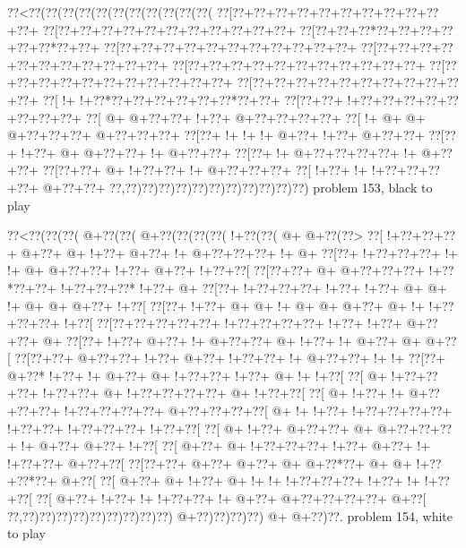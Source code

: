 \vbox{\vbox{\goo
\0??<\0??(\0??(\0??(\0??(\0??(\0??(\0??(\0??(\0??(\0??(\0??(
\0??[\0??+\0??+\0??+\0??+\0??+\0??+\0??+\0??+\0??+\0??+\0??+
\0??[\0??+\0??+\0??+\0??+\0??+\0??+\0??+\0??+\0??+\0??+\0??+
\0??[\0??+\0??+\0??*\0??+\0??+\0??+\0??+\0??+\0??*\0??+\0??+
\0??[\0??+\0??+\0??+\0??+\0??+\0??+\0??+\0??+\0??+\0??+\0??+
\0??[\0??+\0??+\0??+\0??+\0??+\0??+\0??+\0??+\0??+\0??+\0??+
\0??[\0??+\0??+\0??+\0??+\0??+\0??+\0??+\0??+\0??+\0??+\0??+
\0??[\0??+\0??+\0??+\0??+\0??+\0??+\0??+\0??+\0??+\0??+\0??+
\0??[\0??+\0??+\0??+\0??+\0??+\0??+\0??+\0??+\0??+\0??+\0??+
\0??[\- !+\- !+\0??*\0??+\0??+\0??+\0??+\0??+\0??*\0??+\0??+
\0??[\0??+\0??+\- !+\0??+\0??+\0??+\0??+\0??+\0??+\0??+\0??+
\0??[\- @+\- @+\0??+\0??+\- !+\0??+\- @+\0??+\0??+\0??+\0??+
\0??[\- !+\- @+\- @+\- @+\0??+\0??+\0??+\- @+\0??+\0??+\0??+
\0??[\0??+\- !+\- !+\- !+\- @+\0??+\- !+\0??+\- @+\0??+\0??+
\0??[\0??+\- !+\0??+\- @+\- @+\0??+\0??+\- !+\- @+\0??+\0??+
\0??[\0??+\- !+\- @+\0??+\0??+\0??+\0??+\- !+\- @+\0??+\0??+
\0??[\0??+\0??+\- @+\- !+\0??+\0??+\- !+\- @+\0??+\0??+\0??+
\0??[\- !+\0??+\- !+\- !+\0??+\0??+\0??+\0??+\- @+\0??+\0??+
\0??,\0??)\0??)\0??)\0??)\0??)\0??)\0??)\0??)\0??)\0??)\0??)
}
\hfil problem 153, black to play\hfil\break
}

\vbox{\vbox{\goo
\0??<\0??(\0??(\0??(\- @+\0??(\0??(\- @+\0??(\0??(\0??(\0??(\- !+\0??(\0??(\- @+\- @+\0??(\0??>
\0??[\- !+\0??+\0??+\0??+\- @+\0??+\- @+\- !+\0??+\- @+\0??+\- !+\- @+\0??+\0??+\0??+\- !+\- @+
\0??[\0??+\- !+\0??+\0??+\0??+\- !+\- !+\- @+\- @+\0??+\0??+\- !+\0??+\- @+\0??+\- !+\0??+\0??[
\0??[\0??+\0??+\- @+\- @+\0??+\0??+\0??+\- !+\0??*\0??+\0??+\- !+\0??+\0??+\0??*\- !+\0??+\- @+
\0??[\0??+\- !+\0??+\0??+\0??+\- !+\0??+\- !+\0??+\- @+\- @+\- !+\- @+\- @+\- @+\0??+\- !+\0??[
\0??[\0??+\- !+\0??+\- @+\- @+\- !+\- @+\- @+\- @+\0??+\- @+\- !+\- !+\0??+\0??+\0??+\- !+\0??[
\0??[\0??+\0??+\0??+\0??+\0??+\- !+\0??+\0??+\0??+\0??+\- !+\0??+\- !+\0??+\- @+\0??+\0??+\- @+
\0??[\0??+\- !+\0??+\- @+\0??+\- !+\- @+\0??+\0??+\- @+\- !+\0??+\- !+\- @+\0??+\- @+\- @+\0??[
\0??[\0??+\0??+\- @+\0??+\0??+\- !+\0??+\- @+\0??+\- !+\0??+\0??+\- !+\- @+\0??+\0??+\- !+\- !+
\0??[\0??+\- @+\0??*\- !+\0??+\- !+\- @+\0??+\- @+\- !+\0??+\0??+\- !+\0??+\- @+\- !+\- !+\0??[
\0??[\- @+\- !+\0??+\0??+\0??+\- !+\0??+\0??+\- @+\- !+\0??+\0??+\0??+\0??+\- @+\- !+\0??+\0??[
\0??[\- @+\- !+\0??+\- !+\- @+\0??+\0??+\0??+\- !+\0??+\0??+\0??+\0??+\- @+\0??+\0??+\0??+\0??[
\- @+\- !+\- !+\0??+\- !+\0??+\0??+\0??+\0??+\- !+\0??+\0??+\- !+\0??+\0??+\0??+\- !+\0??+\0??[
\0??[\- @+\- !+\0??+\- @+\0??+\0??+\- @+\- @+\0??+\0??+\0??+\- !+\- @+\0??+\- @+\0??+\- !+\0??[
\0??[\- @+\0??+\- @+\- !+\0??+\0??+\0??+\- !+\0??+\- @+\0??+\- !+\- !+\0??+\0??+\- @+\0??+\0??[
\0??[\0??+\0??+\- @+\0??+\- @+\0??+\- @+\- @+\0??*\0??+\- @+\- @+\- !+\0??+\0??*\0??+\- @+\0??[
\0??[\- @+\0??+\- @+\- !+\0??+\- @+\- !+\- !+\- !+\0??+\0??+\0??+\- !+\0??+\- !+\- !+\0??+\0??[
\0??[\- @+\0??+\- !+\0??+\- !+\- !+\0??+\0??+\- !+\- @+\0??+\- @+\0??+\0??+\0??+\0??+\- @+\0??[
\0??,\0??)\0??)\0??)\0??)\0??)\0??)\0??)\0??)\0??)\- @+\0??)\0??)\0??)\0??)\- @+\- @+\0??)\0??.
}
\hfil problem 154, white to play\hfil\break
}

